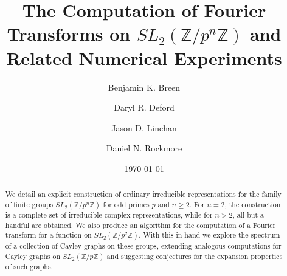 \documentclass[12pt,reqno]{amsart}
\theoremstyle{remark}
\numberwithin{table}{section}
\newcommand{\Z}{\mathbb Z}
\begin{document}
\title[The Computation of Fourier Transforms on $SL_2(\Z/p^n \Z)$]{The Computation of Fourier Transforms on $SL_2(\Z/p^n \Z)$ and Related Numerical Experiments}

\author{Benjamin K. Breen}
\address{Department of Mathematics, Dartmouth College, Hanover, NH 03755}

\author{Daryl R. Deford}
\address{Department of Mathematics, Dartmouth College, Hanover, NH 03755}

\author{Jason D. Linehan}
\address{Department of Mathematics, Dartmouth College, Hanover, NH 03755}

\author{Daniel N. Rockmore}
\address{Departments of Mathematics and Computer Science, Dartmouth College, Hanover, NH 03755}




\date{\today}



\begin{abstract}
We detail an explicit construction %
of ordinary irreducible representations for the family of finite groups $SL_2(\Z /p^n \Z)$ for odd primes $p$ and $n\geq 2$. For $n=2$, the construction is a complete set of irreducible complex representations, while for $n>2$, all but a handful are obtained. We also produce  an algorithm for the computation of a Fourier transform for a function on $SL_2(\Z /p^2 \Z)$.  With this in hand we explore the spectrum of a collection of Cayley graphs on these groups, extending analogous computations for Cayley graphs on $SL_2(\Z/p \Z)$ and suggesting conjectures for the expansion properties of such graphs. 
\end{abstract}

\maketitle
\end{document}
